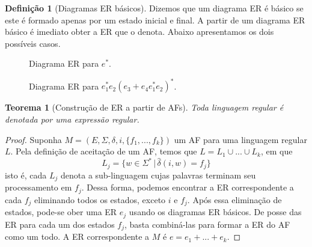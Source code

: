 \documentclass[a4paper]{article}
\newtheorem{Theorem}{Teorema}
\theoremstyle{definition}
\newtheorem{Definition}{Definição}
\begin{document}
  \begin{Definition}[Diagramas ER básicos]
    Dizemos que um diagrama ER é básico se este é formado apenas por um estado
    inicial e final. A partir de um diagrama ER básico é imediato obter a ER
    que o denota. Abaixo apresentamos os dois possíveis casos.
    \begin{figure}[H]
        \centering
        \caption{Diagrama ER para $e^*$.}
      \end{figure}
      \begin{figure}[H]
      \centering
      \caption{Diagrama ER para $e_1^*e_2(e_3 + e_4e_1^*e_2)^*$.}
    \end{figure} 
  \end{Definition}

  \begin{Theorem}[Construção de ER a partir de AFs]\label{teorema2}
    Toda linguagem regular é denotada por uma expressão regular.
  \end{Theorem}
  \begin{proof}
    Suponha $M = (E,\Sigma,\delta,i,\{f_1,...,f_k\})$ um AF para uma linguagem
    regular $L$. Pela definição de aceitação de um AF, temos que
    $L = L_1 \cup ... \cup L_k$, em que
    \[
      L_j = \{w \in \Sigma^*\,|\,\widehat{\delta}(i,w) = f_j\}
    \]
    isto é, cada $L_j$ denota a sub-linguagem cujas palavras
    terminam seu processamento em $f_j$. Dessa forma, podemos encontrar a
    ER correspondente a cada $f_j$ eliminando todos os estados, exceto $i$ e
    $f_j$. Após essa eliminação de estados, pode-se ober uma ER $e_j$ usando
    os diagramas ER básicos. De posse das ER para cada um dos estados $f_j$,
    basta combiná-las para formar a ER do AF como um todo. A ER correspondente a
    $M$ é $e = e_1 + ... + e_k$.
  \end{proof}
\end{document}
